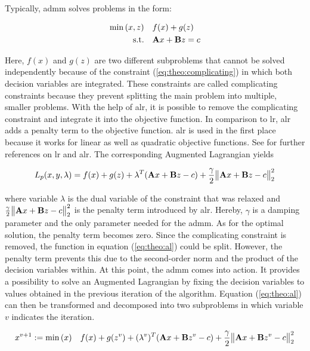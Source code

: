 Typically, \gls{admm} solves problems in the form:

\begin{subequations}
	\begin{align}
		\min{(x, z)} \quad & f(x) + g(z) \\
		\text{s.t.} \quad & \vb{A}x + \vb{B}z = c \label{eq:theo:complicating}
	\end{align}
\end{subequations}

Here, $f(x)$ and $g(z)$ are two different subproblems that cannot be solved independently because of the constraint (\ref{eq:theo:complicating}) in which both decision variables are integrated. These constraints are called complicating constraints because they prevent splitting the main problem into multiple, smaller problems. With the help of \gls{alr}, it is possible to remove the complicating constraint and integrate it into the objective function. In comparison to \gls{lr}, \gls{alr} adds a penalty term to the objective function. \gls{alr} is used in the first place because it works for linear as well as quadratic objective functions. See \citet{conejo2006} for further references on \gls{lr} and \gls{alr}. The corresponding Augmented Lagrangian yields

\begin{equation}
	L_p(x,y, \lambda) = f(x) + g(z) + \lambda^T(\vb{A}x + \vb{B}z - c) + \frac{\gamma}{2}\big\| \vb{A}x + \vb{B}z - c \big\|^2_2 \label{eq:theo:al}
\end{equation}

where variable $\lambda$ is the dual variable of the constraint that was relaxed and $\frac{\gamma}{2}\big\| \vb{A}x + \vb{B}z - c \big\|^2_2$ is the penalty term introduced by \gls{alr}. Hereby, $\gamma$ is a damping parameter and the only parameter needed for the \gls{admm}. As for the optimal solution, the penalty term becomes zero. Since the complicating constraint is removed, the function in equation (\ref{eq:theo:al}) could be split. However, the penalty term prevents this due to the second-order norm and the product of the decision variables within. At this point, the \gls{admm} comes into action. It provides a possibility to solve an Augmented Lagrangian by fixing the decision variables to values obtained in the previous iteration of the algorithm. Equation (\ref{eq:theo:al}) can then be transformed and decomposed into two subproblems in which variable $v$ indicates the iteration.

\begin{equation}
	x^{v+1} := \min{(x)} \quad f(x) + g(z^{v}) + (\lambda^v)^T(\vb{A}x + \vb{B}z^v - c) + \frac{\gamma}{2}\big\| \vb{A}x + \vb{B}z^v - c \big\|^2_2 \label{eq:theo:x-update}
\end{equation}

